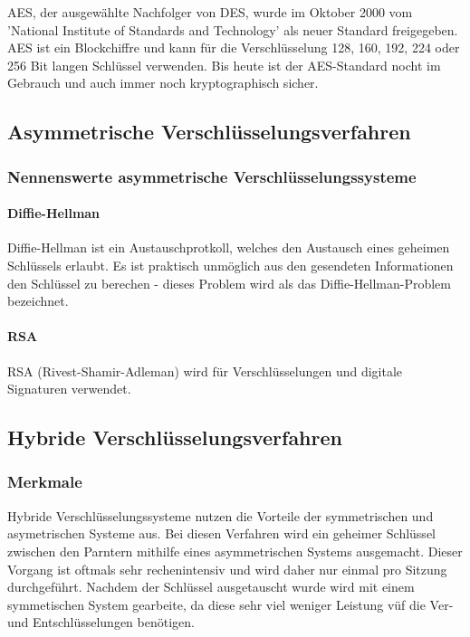 \documentclass[12pt,a4paper]{report}
\begin{document}
\begin{onehalfspace}
AES, der ausgewählte Nachfolger von DES, wurde im Oktober 2000 vom 'National Institute of Standards and Technology' als neuer Standard freigegeben. AES ist ein Blockchiffre und kann für die Verschlüsselung 128, 160, 192, 224 oder 256 Bit langen Schlüssel verwenden. Bis heute ist der AES-Standard nocht im Gebrauch und auch immer noch kryptographisch sicher.

\subsection{Asymmetrische Verschlüsselungsverfahren}

\subsubsection{Nennenswerte asymmetrische Verschlüsselungssysteme}

\paragraph{Diffie-Hellman}

Diffie-Hellman ist ein Austauschprotkoll, welches den Austausch eines geheimen Schlüssels erlaubt. Es ist praktisch unmöglich aus den gesendeten Informationen den Schlüssel zu berechen - dieses Problem wird als das Diffie-Hellman-Problem bezeichnet.

\paragraph{RSA}

RSA (Rivest-Shamir-Adleman) wird für Verschlüsselungen und digitale Signaturen verwendet.

\subsection{Hybride Verschlüsselungsverfahren}

\subsubsection{Merkmale}

Hybride Verschlüsselungssysteme nutzen die Vorteile der symmetrischen und asymetrischen Systeme aus. Bei diesen Verfahren wird ein geheimer Schlüssel zwischen den Parntern mithilfe eines asymmetrischen Systems ausgemacht. Dieser Vorgang ist oftmals sehr rechenintensiv und wird daher nur einmal pro Sitzung durchgeführt. Nachdem der Schlüssel ausgetauscht wurde wird mit einem symmetischen System gearbeite, da diese sehr viel weniger Leistung vüf die Ver- und Entschlüsselungen benötigen.


\end{onehalfspace}
\end{document}

